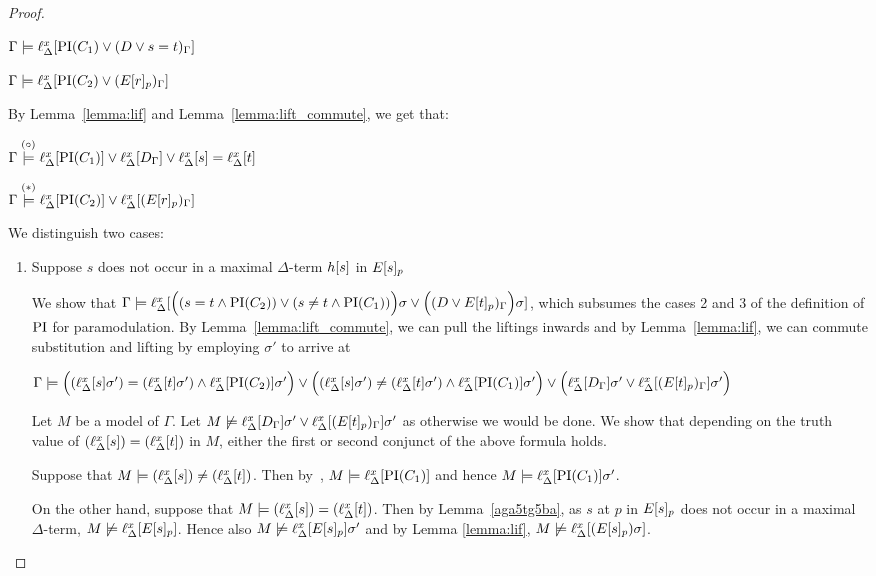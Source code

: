 \documentclass[,%
	paper=a4,%
	DIV14, 
	liststotoc,
	bibtotoc,
	draft=false,%
	numbers=noendperiod
]{scrartcl}
\newcommand{\lif}[1]{\lift{\Delta}{#1}{x}}
\begin{document}
\begin{proof}
\begin{description}
			$\Gamma \entails \lif{\PI(C_1) \lor (D\lor s=t)_\Gamma}$

			$\Gamma \entails \lif{\PI(C_2) \lor (E\occurat{r}{p})_\Gamma}$

			By Lemma~\ref{lemma:lif} and Lemma~\ref{lemma:lift_commute}, we get that:

			$\Gamma \stackrel{\markA}\entails \lif{\PI(C_1)} \lor \lif{D_\Gamma} \lor \lif{s} = \lif{t}$

			$\Gamma \stackrel{\markB}\entails \lif{\PI(C_2)} \lor \lif{(E\occurat{r}{p})_\Gamma}$
\bigskip
		

	
			We distinguish two cases:\nopagebreak
			\begin{enumerate}
				\item Suppose $s$ does not occur in a maximal $\Delta$-term $h[s]$ in $E{[s]_{p}}$
\label{klehjy}

					We show that $\Gamma \entails \lif{ \Big((s=t \land \PI(C_2)) \lor (s\neq t \land \PI(C_1))\Big)\sigma \lor \Big((D \lor E\occurat{t}{p})_\Gamma\Big)\sigma}$, which subsumes the cases 2 and 3 of the definition of $\operatorname{PI}$ for paramodulation.
					By Lemma~\ref{lemma:lift_commute}, we can pull the liftings inwards and by Lemma~\ref{lemma:lif}, we can commute substitution and lifting by employing $\sigma'$ to arrive at

				$\Gamma \entails
				\Big((\lif{s}\sigma')=(\lif{t}\sigma') \land \lif{\PI(C_2)}\sigma'\Big) \lor
				\Big((\lif{s}\sigma')\neq(\lif{t}\sigma') \land \lif{\PI(C_1)}\sigma'\Big) \lor
				\Big(\lif{D_\Gamma}\sigma' \lor \lif{(E\occurat{t}{p})_\Gamma}\sigma'\Big)$

				Let $M$ be a model of $\Gamma$. Let $M \notentails \lif{D_\Gamma}\sigma' \lor \lif{(E\occurat{t}{p})_\Gamma}\sigma'$ as otherwise we would be done. We show that depending on the truth value of  $(\lif{s}) = (\lif{t})$ in $M$, either the first or second conjunct of the above formula holds.

				Suppose that $M \entails (\lif{s}) \neq (\lif{t})$. 
				Then by~\markA, $M \entails \lif{\PI(C_1)}$ and hence $M \entails \lif{\PI(C_1)}\sigma'$.

				On the other hand, suppose that $M \entails (\lif{s}) = (\lif{t})$.
				Then by Lemma~\ref{aga5tg5ba}, as $s$ at $p$ in $E{[s]_{p}}$ does not occur in a maximal $\Delta$-term, 
				$M \notentails \lif{E\occurat{s}{p}}$.
				Hence also $M \notentails \lif{E\occurat{s}{p}}\sigma'$ and
				by Lemma \ref{lemma:lif}, $M\notentails \lif{(E\occurat{s}{p})\sigma}$. 


\end{enumerate}
\end{description}
\end{proof}
\end{document}
